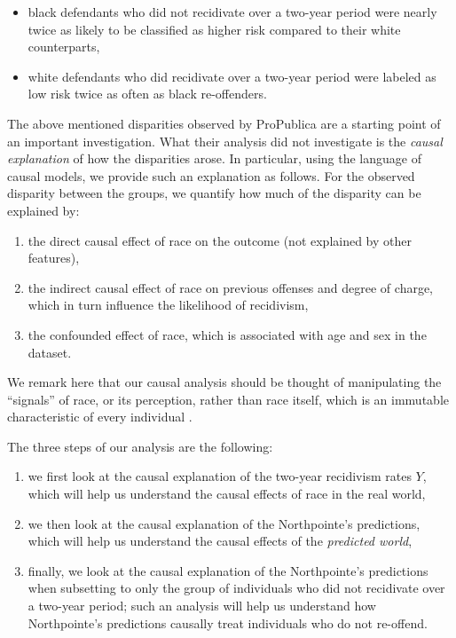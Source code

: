 \documentclass{article}
\providecommand{\tightlist}{%
  \setlength{\itemsep}{0pt}\setlength{\parskip}{0pt}}
\begin{document}
\begin{itemize}
\tightlist
\item
  black defendants who did not recidivate over a two-year period were
  nearly twice as likely to be classified as higher risk compared to
  their white counterparts,
\item
  white defendants who did recidivate over a two-year period were
  labeled as low risk twice as often as black re-offenders.
\end{itemize}

The above mentioned disparities observed by ProPublica are a starting
point of an important investigation. What their analysis did not
investigate is the \emph{causal explanation} of how the disparities
arose. In particular, using the language of causal models, we provide
such an explanation as follows. For the observed disparity between the
groups, we quantify how much of the disparity can be explained by:

\begin{enumerate}[label=(\roman*)]
  \item the direct causal effect of race on the outcome (not explained by other features),
  \item  the indirect causal effect of race on previous offenses and degree of charge, which in turn influence the likelihood of recidivism,
  \item the confounded effect of race, which is associated with age and sex in the dataset.
\end{enumerate}

We remark here that our causal analysis should be thought of
manipulating the ``signals'' of race, or its perception, rather than
race itself, which is an immutable characteristic of every individual
\cite{weinberger2022signal, greiner2011causal}.

The three steps of our analysis are the following:

\begin{enumerate}[label=(\Alph*)]
  \item we first look at the causal explanation of the two-year recidivism rates $Y$, which will help us understand the causal effects of race in the real world,
  \item  we then look at the causal explanation of the Northpointe's predictions, which will help us understand the causal effects of the \textit{predicted world},
  \item finally, we look at the causal explanation of the Northpointe's predictions when subsetting to only the group of individuals who did not recidivate over a two-year period; such an analysis will help us understand how Northpointe's predictions causally treat individuals who do not re-offend.
\end{enumerate}
\end{document}
